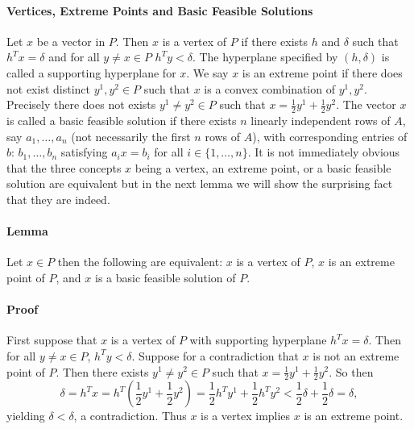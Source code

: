 \paragraph{Vertices, Extreme Points and Basic Feasible Solutions}
Let $x$ be a vector in $P$. Then $x$ is a vertex of $P$ if there exists $h$ and $\delta$ such that $h^Tx = \delta$ and for all $y \neq x \in P$ $h^Ty < \delta$. The hyperplane specified by $(h,\delta)$ is called a supporting hyperplane for $x$. We say $x$ is an extreme point if there does not exist distinct $y^1, y^2 \in P$ such that $x$ is a convex combination of $y^1, y^2$. Precisely there does not exists $y^1 \neq y^2 \in P$ such that $x = \frac{1}{2} y^1 + \frac{1}{2}y^2$. The vector $x$ is called a basic feasible solution if there exists $n$ linearly independent rows of $A$, say $a_1, \dots, a_n$ (not necessarily the first $n$ rows of $A$), with corresponding entries of $b$: $b_1, \dots, b_n$ satisfying $a_i x = b_i$ for all $i\in \{1,\dots, n\}$. It is not immediately obvious that the three concepts $x$ being a vertex, an extreme point, or a basic feasible solution are equivalent but in the next lemma we will show the surprising fact that they are indeed.
\paragraph{Lemma} Let $x \in P$ then the following are equivalent: $x$ is a vertex of $P$, $x$ is an extreme point of $P$, and $x$ is a basic feasible solution of $P$.
\paragraph{Proof}
First suppose that $x$ is a vertex of $P$ with supporting hyperplane $h^T x = \delta$. Then for all $y \neq x \in P$, $h^Ty < \delta$. Suppose for a contradiction that $x$ is not an extreme point of $P$. Then there exists $y^1 \neq y^2 \in P$ such that $x = \frac{1}{2}y^1 + \frac{1}{2} y^2$. So then $$\delta = h^T x = h^T(\frac{1}{2} y^1 + \frac{1}{2} y^2) = \frac{1}{2}h^Ty^1 + \frac{1}{2} h^Ty^2 < \frac{1}{2}\delta + \frac{1}{2} \delta = \delta,$$ yielding $\delta < \delta$, a contradiction. Thus $x$ is a vertex implies $x$ is an extreme point.
